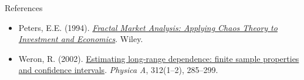 \begin{frame}{References}
\begin{itemize}
    \item Peters, E.E. (1994). \href{https://www.wiley.com/en-us/Fractal+Market+Analysis\%3A+Applying+Chaos+Theory+to+Investment+and+Economics-p-9780471585244}{\textit{Fractal Market Analysis: Applying Chaos Theory to Investment and Economics}}. Wiley.
    \item Weron, R. (2002). \href{https://doi.org/10.1016/S0378-4371(02)00961-5}{Estimating long-range dependence: finite sample properties and confidence intervals}. \textit{Physica A}, 312(1--2), 285--299.
\end{itemize}
\end{frame}


